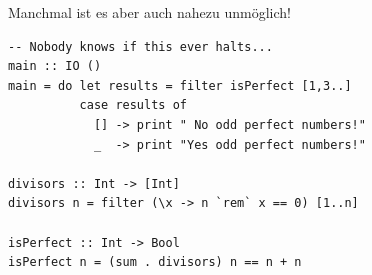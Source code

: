 \documentclass[aspectratio=169]{beamer}
\begin{document}

\begin{frame}[fragile]

Manchmal ist es aber auch nahezu unmöglich!

\begin{framed}
\begin{verbatim}
-- Nobody knows if this ever halts...
main :: IO ()
main = do let results = filter isPerfect [1,3..]
          case results of
            [] -> print " No odd perfect numbers!"
            _  -> print "Yes odd perfect numbers!"

divisors :: Int -> [Int]
divisors n = filter (\x -> n `rem` x == 0) [1..n]

isPerfect :: Int -> Bool
isPerfect n = (sum . divisors) n == n + n
\end{verbatim}
\end{framed}


\end{frame}


\end{document}
